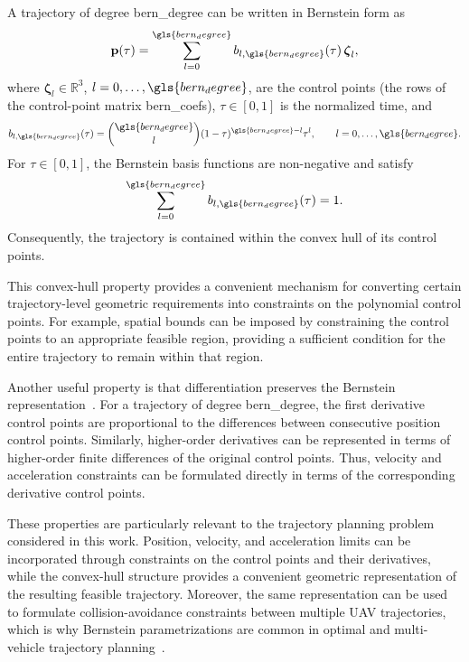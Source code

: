 A trajectory of degree \gls{bern_degree} can be written in Bernstein form as
\begin{equation}
\mathbf{p}(\tau)
=
\sum_{l=0}^{\gls{bern_degree}} b_{l,\gls{bern_degree}}(\tau)\,\boldsymbol{\zeta}_l,
\label{eq.3:bernstein_curve}
\end{equation}
where $\boldsymbol{\zeta}_l\in\mathbb{R}^3$, $l=0,\ldots,\gls{bern_degree}$, are the control points (the rows of the control-point matrix \gls{bern_coefs}), $\tau\in[0,1]$ is the normalized time, and
\begin{equation}
b_{l,\gls{bern_degree}}(\tau)
=
\binom{\gls{bern_degree}}{l}
(1-\tau)^{\gls{bern_degree}-l}\tau^l,
\qquad l=0,\ldots,\gls{bern_degree}.
\end{equation}
For \(\tau\in[0,1]\), the Bernstein basis functions are non-negative and satisfy
\begin{equation}
\sum_{l=0}^{\gls{bern_degree}} b_{l,\gls{bern_degree}}(\tau)=1.
\end{equation}
Consequently, the trajectory is contained within the convex hull of its control points.

This convex-hull property provides a convenient mechanism for converting certain trajectory-level geometric requirements into constraints on the polynomial control points. For example, spatial bounds can be imposed by constraining the control points to an appropriate feasible region, providing a sufficient condition for the entire trajectory to remain within that region.

Another useful property is that differentiation preserves the Bernstein representation~\cite{farin2002,farouki1988}. For a trajectory of degree \gls{bern_degree}, the first derivative control points are proportional to the differences between consecutive position control points. Similarly, higher-order derivatives can be represented in terms of higher-order finite differences of the original control points. Thus, velocity and acceleration constraints can be formulated directly in terms of the corresponding derivative control points.

These properties are particularly relevant to the trajectory  planning problem considered in this work. Position, velocity, and acceleration limits can be incorporated through constraints on the control points and their derivatives, while the convex-hull structure provides a convenient geometric representation of the resulting feasible trajectory. Moreover, the same representation can be used to formulate collision-avoidance constraints between multiple UAV trajectories, which is why Bernstein parametrizations are common in optimal and multi-vehicle trajectory planning~\cite{cichella2018,kielasjensen2022,luis2020}.

